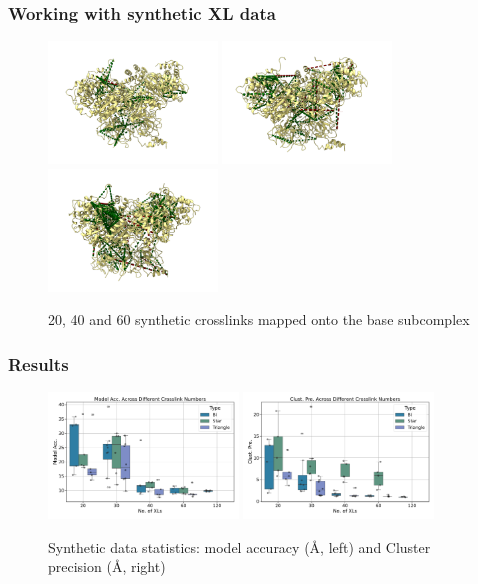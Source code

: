 \documentclass[a4paper,8pt]{beamer}
\begin{document}
\begin{frame}
\frametitle{Working with synthetic XL data}
%
\begin{figure}
  \centering
\includegraphics[width=0.4\textwidth]{test-figures/20_syn.png}
\includegraphics[width=0.4\textwidth]{test-figures/40_syn.png}
\includegraphics[width=0.4\textwidth]{test-figures/60_syn.png}
\caption{20, 40 and 60 synthetic crosslinks mapped onto the base subcomplex}
\end{figure}
\end{frame}
\begin{frame}
  \frametitle{Results}
  \begin{figure}
  \centering
  \includegraphics[width=0.45\textwidth]{test-figures/whisker_plot_model_acc.pdf}
  \includegraphics[width=0.45\textwidth]{test-figures/whisker_plot_clust_pre.pdf}
  \caption{Synthetic data statistics: model accuracy ({\AA}, left) and 
  Cluster precision ({\AA}, right)}
  \label{fig:synthetic_data_statistics}
  \end{figure}
  \end{frame}
\end{document}
